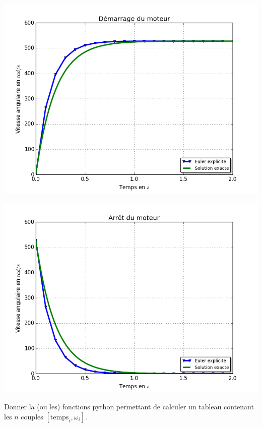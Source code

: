 \documentclass[10pt,fleqn]{article} %
\begin{document}
\begin{minipage}[c]{.47\linewidth}
\begin{center}
\includegraphics[width=.95\textwidth]{images/fig_04_bis}
\end{center}
\end{minipage}
\hfill
\begin{minipage}[c]{.47\linewidth}
\begin{center}
\includegraphics[width=.95\textwidth]{images/fig_05_bis}
\end{center}
\end{minipage}

\begin{exemple}
Donner la (ou les) fonctions python permettant de calculer un tableau contenant les $n$ couples $[\text{temps}_i,\omega_i]$. 
\vspace{10cm}
\end{exemple}
\end{document}
